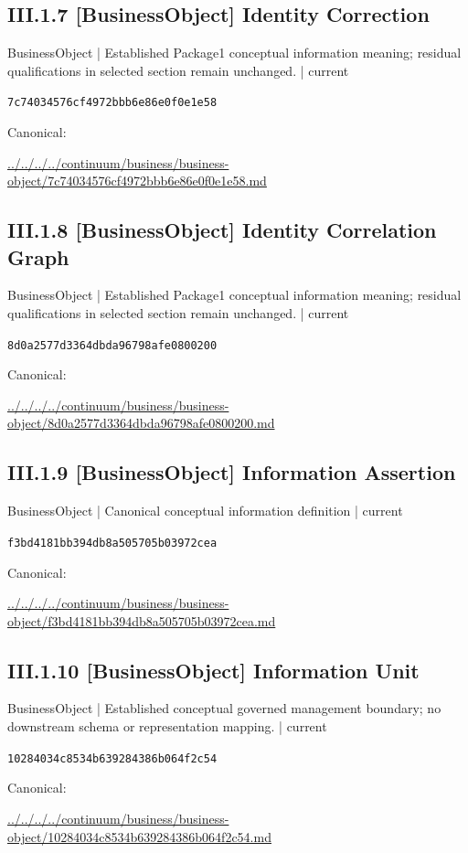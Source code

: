 \documentclass[10pt,a4paper]{article}
\begin{document}
\subsection*{III.1.7 [BusinessObject] Identity Correction}
\label{element-7c74034576cf4972bbb6e86e0f0e1e58}
{\small BusinessObject | Established Package1 conceptual information meaning; residual qualifications in selected section remain unchanged. | current}\par
\texttt{7c74034576cf4972bbb6e86e0f0e1e58}\par
Canonical: \par
{\footnotesize\url{../../../../continuum/business/business-object/7c74034576cf4972bbb6e86e0f0e1e58.md}}\par
\subsection*{III.1.8 [BusinessObject] Identity Correlation Graph}
\label{element-8d0a2577d3364dbda96798afe0800200}
{\small BusinessObject | Established Package1 conceptual information meaning; residual qualifications in selected section remain unchanged. | current}\par
\texttt{8d0a2577d3364dbda96798afe0800200}\par
Canonical: \par
{\footnotesize\url{../../../../continuum/business/business-object/8d0a2577d3364dbda96798afe0800200.md}}\par
\subsection*{III.1.9 [BusinessObject] Information Assertion}
\label{element-f3bd4181bb394db8a505705b03972cea}
{\small BusinessObject | Canonical conceptual information definition | current}\par
\texttt{f3bd4181bb394db8a505705b03972cea}\par
Canonical: \par
{\footnotesize\url{../../../../continuum/business/business-object/f3bd4181bb394db8a505705b03972cea.md}}\par
\subsection*{III.1.10 [BusinessObject] Information Unit}
\label{element-10284034c8534b639284386b064f2c54}
{\small BusinessObject | Established conceptual governed management boundary; no downstream schema or representation mapping. | current}\par
\texttt{10284034c8534b639284386b064f2c54}\par
Canonical: \par
{\footnotesize\url{../../../../continuum/business/business-object/10284034c8534b639284386b064f2c54.md}}\par
\end{document}
